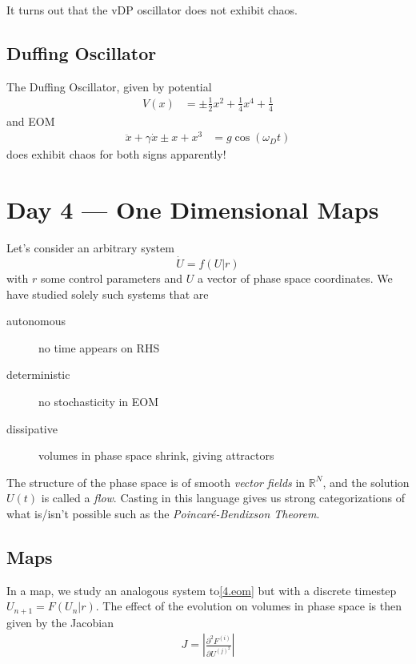 \documentclass[10pt]{article}
\newcommand{\ptd}[2]{\frac{\partial^2 #1}{\partial#2^2}}
\newcommand{\abs}[1]{\left|#1\right|}
\begin{document}
It turns out that the vDP oscillator does not exhibit chaos.

\subsection{Duffing Oscillator}

The Duffing Oscillator, given by potential
\begin{align}
    V(x) &= \pm \frac{1}{2}x^2 + \frac{1}{4}x^4 + \frac{1}{4}
\end{align}
and EOM
\begin{align}
    \ddot{x} + \gamma \dot{x} \pm x + x^3 &= g\cos(\omega_D t)
\end{align}
does exhibit chaos for both signs apparently!

\section{Day 4 --- One Dimensional Maps}

Let's consider an arbitrary system
\begin{equation}
    \dot{U} = f(U|r)\label{4.eom}
\end{equation}
with $r$ some control parameters and $U$ a vector of phase space coordinates. We have studied solely such systems that are
\begin{description}
    \item[autonomous] no time appears on RHS
    \item[deterministic] no stochasticity in EOM
    \item[dissipative] volumes in phase space shrink, giving attractors
\end{description}

The structure of the phase space is of smooth \emph{vector fields} in $\mathbb{R}^N$, and the solution $U(t)$ is called a \emph{flow}. Casting in this language gives us strong categorizations of what is/isn't possible such as the \emph{Poincar\'e-Bendixson Theorem}.

\subsection{Maps}

In a map, we study an analogous system to\eqref{4.eom} but with a discrete timestep $U_{n+1} = F(U_n|r)$. The effect of the evolution on volumes in phase space is then given by the Jacobian
\begin{align}
    J = \abs{\ptd{F^{(i)}}{U^{(j)}}}
\end{align}
\end{document}
